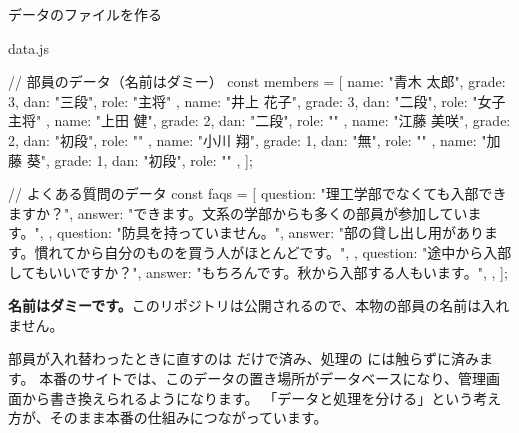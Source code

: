 \begin{step}{データのファイルを作る}
\begin{filebox}{data.js}
\begin{Piton}[language=code]
// 部員のデータ（名前はダミー）
const members = [
  { name: "青木 太郎", grade: 3, dan: "三段", role: "主将" },
  { name: "井上 花子", grade: 3, dan: "二段", role: "女子主将" },
  { name: "上田 健", grade: 2, dan: "二段", role: "" },
  { name: "江藤 美咲", grade: 2, dan: "初段", role: "" },
  { name: "小川 翔", grade: 1, dan: "無", role: "" },
  { name: "加藤 葵", grade: 1, dan: "初段", role: "" },
];

// よくある質問のデータ
const faqs = [
  {
    question: "理工学部でなくても入部できますか？",
    answer: "できます。文系の学部からも多くの部員が参加しています。",
  },
  {
    question: "防具を持っていません。",
    answer: "部の貸し出し用があります。慣れてから自分のものを買う人がほとんどです。",
  },
  {
    question: "途中から入部してもいいですか？",
    answer: "もちろんです。秋から入部する人もいます。",
  },
];
\end{Piton}
\end{filebox}
\textbf{名前はダミーです。}このリポジトリは公開されるので、本物の部員の名前は入れません。
\end{step}

\begin{why}[データと処理を別のファイルに分ける理由]
部員が入れ替わったときに直すのは  だけで済み、処理の  には触らずに済みます。
本番のサイトでは、このデータの置き場所がデータベースになり、管理画面から書き換えられるようになります。
「データと処理を分ける」という考え方が、そのまま本番の仕組みにつながっています。
\end{why}

